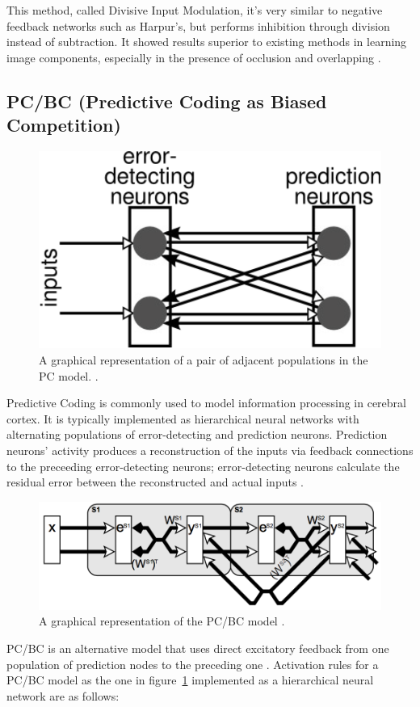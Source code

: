 \documentclass[a4paper,12pt]{article}
\begin{document}
		This method, called Divisive Input Modulation, it's very similar to negative feedback networks such as Harpur's, but performs inhibition through division instead of subtraction.
		It showed results superior to existing methods in learning image components, especially in the presence of occlusion and overlapping \cite{spratling2009unsupervised}.
		
	\subsection{PC/BC (Predictive Coding as Biased Competition)}
		\begin{figure}[H]
  			\centering
			\includegraphics[scale=0.6]{prediction}
			\caption{A graphical representation of a pair of adjacent populations in the PC model. \cite{spratling2014predictive}.}
		\end{figure}
		Predictive Coding is commonly used to model information processing in cerebral cortex. It is typically implemented as hierarchical neural networks
		with alternating populations of error-detecting and prediction neurons. Prediction neurons' activity produces a reconstruction of the inputs
		via feedback connections to the preceeding error-detecting neurons; error-detecting neurons calculate the residual error between
		the reconstructed and actual inputs \cite{spratling2014predictive}.
		\begin{figure}[H]
  			\centering
			\includegraphics[scale=0.4]{pcbc}
			\caption{A graphical representation of the PC/BC model \cite{spratling2008predictive}.}
			\label{fig:pcbc}
		\end{figure}
		PC/BC is an alternative model that uses direct excitatory feedback from one population of prediction nodes to the preceding one \cite{spratling2008predictive}.
		Activation rules for a PC/BC model as the one in figure~\ref{fig:pcbc} implemented as a hierarchical neural network are as follows:
		
\end{document}
